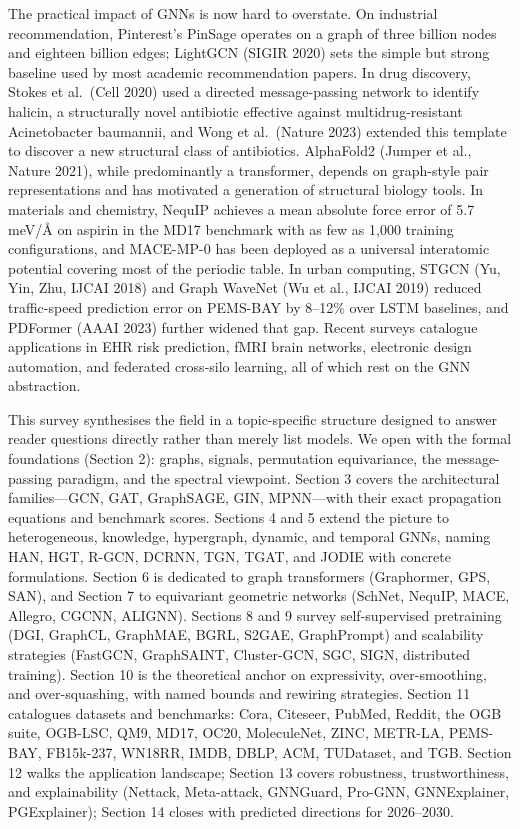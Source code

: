 The practical impact of GNNs is now hard to overstate. On industrial recommendation, Pinterest's PinSage operates on a graph of three billion nodes and eighteen billion edges; LightGCN (SIGIR 2020) sets the simple but strong baseline used by most academic recommendation papers. In drug discovery, Stokes et al.~(Cell 2020) used a directed message-passing network to identify halicin, a structurally novel antibiotic effective against multidrug-resistant Acinetobacter baumannii, and Wong et al.~(Nature 2023) extended this template to discover a new structural class of antibiotics. AlphaFold2 (Jumper et al., Nature 2021), while predominantly a transformer, depends on graph-style pair representations and has motivated a generation of structural biology tools. In materials and chemistry, NequIP achieves a mean absolute force error of 5.7 meV/Å on aspirin in the MD17 benchmark with as few as 1,000 training configurations, and MACE-MP-0 has been deployed as a universal interatomic potential covering most of the periodic table. In urban computing, STGCN (Yu, Yin, Zhu, IJCAI 2018) and Graph WaveNet (Wu et al., IJCAI 2019) reduced traffic-speed prediction error on PEMS-BAY by 8--12\% over LSTM baselines, and PDFormer (AAAI 2023) further widened that gap. Recent surveys catalogue applications in EHR risk prediction, fMRI brain networks, electronic design automation, and federated cross-silo learning, all of which rest on the GNN abstraction.

This survey synthesises the field in a topic-specific structure designed to answer reader questions directly rather than merely list models. We open with the formal foundations (Section 2): graphs, signals, permutation equivariance, the message-passing paradigm, and the spectral viewpoint. Section 3 covers the architectural families---GCN, GAT, GraphSAGE, GIN, MPNN---with their exact propagation equations and benchmark scores. Sections 4 and 5 extend the picture to heterogeneous, knowledge, hypergraph, dynamic, and temporal GNNs, naming HAN, HGT, R-GCN, DCRNN, TGN, TGAT, and JODIE with concrete formulations. Section 6 is dedicated to graph transformers (Graphormer, GPS, SAN), and Section 7 to equivariant geometric networks (SchNet, NequIP, MACE, Allegro, CGCNN, ALIGNN). Sections 8 and 9 survey self-supervised pretraining (DGI, GraphCL, GraphMAE, BGRL, S2GAE, GraphPrompt) and scalability strategies (FastGCN, GraphSAINT, Cluster-GCN, SGC, SIGN, distributed training). Section 10 is the theoretical anchor on expressivity, over-smoothing, and over-squashing, with named bounds and rewiring strategies. Section 11 catalogues datasets and benchmarks: Cora, Citeseer, PubMed, Reddit, the OGB suite, OGB-LSC, QM9, MD17, OC20, MoleculeNet, ZINC, METR-LA, PEMS-BAY, FB15k-237, WN18RR, IMDB, DBLP, ACM, TUDataset, and TGB. Section 12 walks the application landscape; Section 13 covers robustness, trustworthiness, and explainability (Nettack, Meta-attack, GNNGuard, Pro-GNN, GNNExplainer, PGExplainer); Section 14 closes with predicted directions for 2026--2030.

